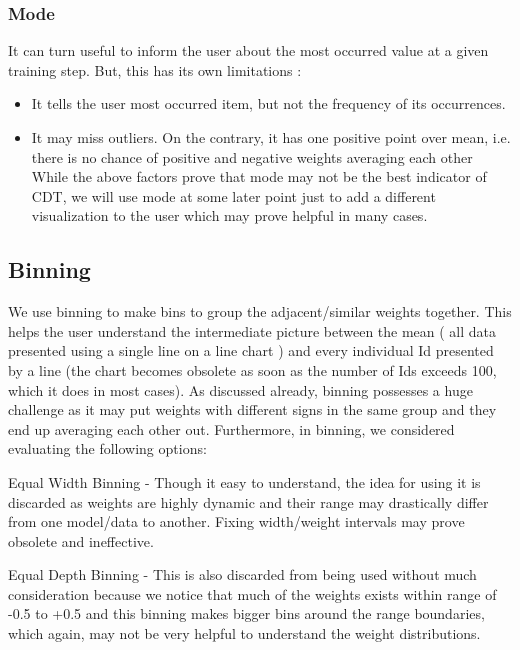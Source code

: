 \documentclass[journal]{vgtc}                %
\begin{document}
\subsubsection{Mode}It can turn useful to inform the user about the most occurred value at a given training step. But, this has its own limitations :
\begin{itemize}
\item It tells the user most occurred item, but not the frequency of its occurrences.
\item It may miss outliers.
On the contrary, it has one positive point over mean, i.e. there is no chance of positive and negative weights averaging each other
While the above factors prove that mode may not be the best indicator of CDT, we will  use mode at some later point just to add a different visualization to the user which may prove helpful in many cases. 
\end{itemize}

\subsection{Binning }
We use binning to make bins to group the adjacent/similar weights together. This helps the user understand the intermediate picture between the mean ( all data presented using a single line on a line chart ) and every individual Id presented by a line (the chart becomes obsolete as soon as the number of Ids exceeds 100, which it does in most cases).
As discussed already, binning possesses a huge challenge as it may put weights with different signs in the same group and they end up averaging each other out. Furthermore, in binning, we considered evaluating the following options: 

Equal Width Binning - Though it easy to understand, the idea for using it is discarded as weights are highly dynamic and their range may drastically differ from one model/data to another. Fixing width/weight intervals may prove obsolete and ineffective.

Equal Depth Binning - This is also discarded from being used without much consideration because we notice that much of the weights exists within range of -0.5 to +0.5 and this binning  makes bigger bins around the range boundaries, which again, may not be very helpful to understand the weight distributions.
\end{document}
